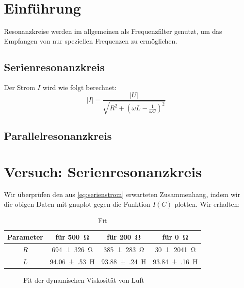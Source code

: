 \section{Einführung}
Resonanzkreise werden im allgemeinen als Frequenzfilter genutzt, um das Empfangen von nur speziellen Frequenzen zu ermöglichen.
\subsection{Serienresonanzkreis}
Der Strom $I$ wird wie folgt berechnet:
\begin{equation}
  |I|=\frac{|U|}{\sqrt{R^2+(\omega L-\frac{1}{\omega C})^2}}
  \label{eq:serienstrom}
\end{equation}
\subsection{Parallelresonanzkreis}
\section{Versuch: Serienresonanzkreis}
Wir überprüfen den aus \cref{eq:serienstrom} erwarteten Zusammenhang, indem wir die obigen Daten mit gnuplot gegen die Funktion $I(C)$ plotten. Wir erhalten:
\begin{table}[H]
  \centering
  \begin{tabular}{c c c c} \toprule
    Parameter & für \SI{500}{\ohm} & für \SI{200}{\ohm} & für \SI{0}{\ohm} \\ \midrule
    $R$ & \SI{694(326)}{\ohm} & \SI{385(283)}{\ohm}  & \SI{30(2041)}{\ohm} \\
    $L$ & \SI{94.06(53)}{\henry} & \SI{93.88(24)}{\henry} & \SI{93.84(16)}{\henry} \\ \bottomrule 
  \end{tabular}
  \caption{Fit}
  \label{tab:serienfit}
\end{table}

\begin{figure}[H]
\centering
{}
\caption{Fit der dynamischen Viskosität von Luft}
\label{fig:dynviskos}
\end{figure}
